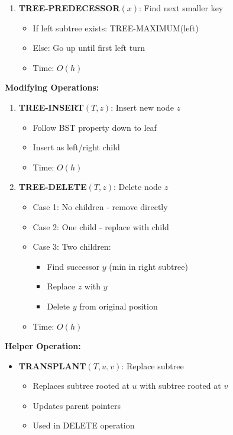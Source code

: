 \begin{enumerate}[noitemsep,leftmargin=*]
    \item \textbf{TREE-PREDECESSOR$(x)$}: Find next smaller key
        \begin{itemize}[noitemsep,topsep=0pt]
            \item If left subtree exists: TREE-MAXIMUM(left)
            \item Else: Go up until first left turn
            \item Time: $O(h)$
        \end{itemize}
\end{enumerate}

\textbf{Modifying Operations:}
\begin{enumerate}[noitemsep,leftmargin=*]
    \item \textbf{TREE-INSERT$(T,z)$}: Insert new node $z$
        \begin{itemize}[noitemsep,topsep=0pt]
            \item Follow BST property down to leaf
            \item Insert as left/right child
            \item Time: $O(h)$
        \end{itemize}
    
    \item \textbf{TREE-DELETE$(T,z)$}: Delete node $z$
        \begin{itemize}[noitemsep,topsep=0pt]
            \item Case 1: No children - remove directly
            \item Case 2: One child - replace with child
            \item Case 3: Two children:
                \begin{itemize}[noitemsep,topsep=0pt]
                    \item Find successor $y$ (min in right subtree)
                    \item Replace $z$ with $y$
                    \item Delete $y$ from original position
                \end{itemize}
            \item Time: $O(h)$
        \end{itemize}
\end{enumerate}

\textbf{Helper Operation:}
\begin{itemize}[noitemsep,leftmargin=*]
    \item \textbf{TRANSPLANT$(T,u,v)$}: Replace subtree
        \begin{itemize}[noitemsep,topsep=0pt]
            \item Replaces subtree rooted at $u$ with subtree rooted at $v$
            \item Updates parent pointers
            \item Used in DELETE operation
        \end{itemize}
\end{itemize}

